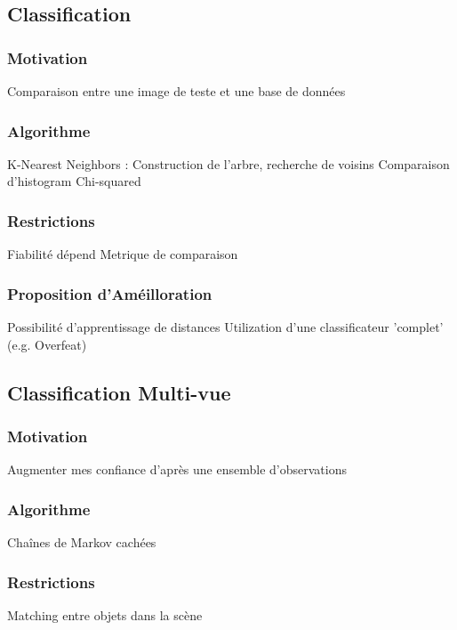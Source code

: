 \begin{itemize}
    \subsection {Classification}

        \subsubsection{Motivation}
            Comparaison entre une image de teste et une base de données

        \subsubsection{Algorithme}
            K-Nearest Neighbors : Construction de l'arbre, recherche de voisins
            Comparaison d'histogram Chi-squared

        \subsubsection{Restrictions}
            Fiabilité dépend Metrique de comparaison 
        
        \subsubsection{Proposition d'Améilloration}
            Possibilité d'apprentissage de distances
            Utilization d'une classificateur 'complet' (e.g. Overfeat)


    \subsection {Classification Multi-vue}

        \subsubsection{Motivation}
            Augmenter mes confiance d'après une ensemble d'observations

        \subsubsection{Algorithme}
            Chaînes de Markov cachées 

        \subsubsection{Restrictions}
            Matching entre objets dans la scène
        

\end{itemize}
